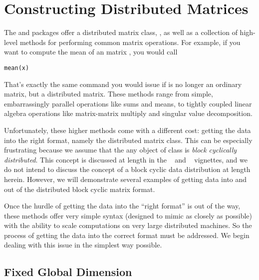 

\chapter{Constructing Distributed Matrices}

The  and  packages offer a distributed matrix class, , as well as a collection of high-level methods for performing common matrix operations.  For example, if you want to compute the mean of an  matrix , you would call 
\begin{lstlisting}[language=rr]
mean(x)
\end{lstlisting}
That's exactly the same command you would issue if  is no longer an ordinary  matrix, but a distributed matrix.  These methods range from simple, embarrassingly parallel operations like sums and means, to tightly coupled linear algebra operations like matrix-matrix multiply and singular value decomposition.

Unfortunately, these higher methods come with a different cost:  getting the data into the right format, namely the distributed matrix class.  This can be especially frustrating because we assume that the any object of class  is \emph{block cyclically distributed}.  This concept is discussed at length in the ~\citep{Schmidt2012pbdBASEvignette} and ~\citep{Schmidt2012pbdDMATvignette} vignettes, and we do not intend to discuss the concept of a block cyclic data distribution at length herein.  However, we will demonstrate several examples of getting data into and out of the distributed block cyclic matrix format.

Once the hurdle of getting the data into the ``right format'' is out of the way, these methods offer very simple syntax (designed to mimic  as closely as possible) with the ability to scale computations on very large distributed machines.  So the process of getting the data into the correct format must be addressed.  We begin dealing with this issue in the simplest way possible.  




\section{Fixed Global Dimension}



